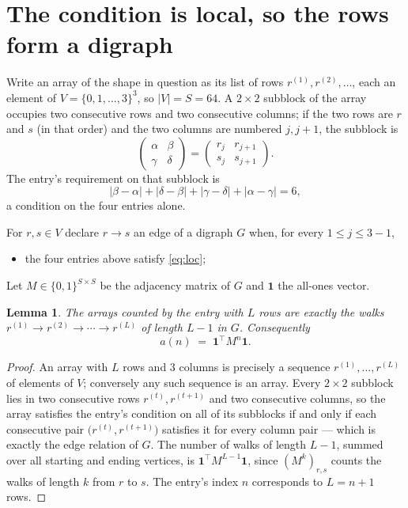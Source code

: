 \documentclass[11pt,a4paper]{article}
\theoremstyle{plain}
\newtheorem{lemma}[theorem]{Lemma}
\theoremstyle{definition}
\begin{document}
\section{The condition is local, so the rows form a digraph}

Write an array of the shape in question as its list of rows
$r^{(1)},r^{(2)},\dots$, each an element of
$V=\{0,1,\dots,3\}^{3}$, so $|V|=S=64$. A $2\times2$ subblock of the array
occupies two consecutive rows and two consecutive columns; if the two rows are $r$
and $s$ (in that order) and the two columns are numbered $j,j+1$,
the subblock is
\[
\begin{pmatrix}\alpha&\beta\\\gamma&\delta\end{pmatrix}=\begin{pmatrix}r_j&r_{j+1}\\s_j&s_{j+1}\end{pmatrix}.
\]
The entry's requirement on that subblock is
\begin{equation}\label{eq:loc}
|\beta-\alpha|+|\delta-\beta|+|\gamma-\delta|+|\alpha-\gamma|=6,
\end{equation}
a condition on the four entries alone.

For $r,s\in V$ declare $r\to s$ an edge of a digraph $G$ when, for every
$1\le j\le 3-1$,
\begin{itemize}
\item the four entries above satisfy \eqref{eq:loc};

\end{itemize}
Let $M\in\{0,1\}^{S\times S}$ be the adjacency matrix of $G$ and $\mathbf{1}$ the
all-ones vector.

\begin{lemma}\label{lem:walk}
The arrays counted by the entry with $L$ rows are exactly the walks
$r^{(1)}\to r^{(2)}\to\cdots\to r^{(L)}$ of length $L-1$ in $G$. Consequently
\[
a(n)\;=\;\mathbf{1}^{\!\top}M^{n}\mathbf{1} .
\]
\end{lemma}

\begin{proof}
An array with $L$ rows and $3$ columns is precisely a sequence
$r^{(1)},\dots,r^{(L)}$ of elements of $V$; conversely any such sequence is an array.
Every $2\times2$ subblock lies in two consecutive rows $r^{(t)},r^{(t+1)}$ and two
consecutive columns, so the array satisfies the entry's condition on all of its subblocks
if and only if each consecutive pair $\bigl(r^{(t)},r^{(t+1)}\bigr)$ satisfies it for
every column pair --- which is exactly the edge relation of $G$. The number of walks of
length $L-1$, summed over all starting and ending vertices, is
$\mathbf{1}^{\!\top}M^{L-1}\mathbf{1}$, since $(M^{k})_{r,s}$ counts the walks of
length $k$ from $r$ to $s$. The entry's index $n$ corresponds to $L=n+1$ rows.
\end{proof}
\end{document}
